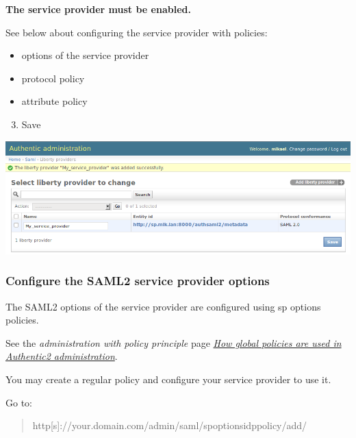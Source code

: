 \documentclass[letterpaper,10pt,english]{sphinxmanual}
\begin{document}
\textbf{The service provider must be enabled.}

See below about configuring the service provider with policies:
\begin{itemize}
\item {} 
options of the service provider

\item {} 
protocol policy

\item {} 
attribute policy

\end{itemize}
\begin{enumerate}
\setcounter{enumi}{2}
\item {} 
Save

\end{enumerate}

\includegraphics{new_saml2_sp_saved.png}


\subsubsection{Configure the SAML2 service provider options}
\label{config_saml2_sp:configure-the-saml2-service-provider-options}
The SAML2 options of the service provider are configured using sp options
policies.

See the \emph{administration with policy principle} page {\hyperref[administration_with_policies:administration-with-policies]{\emph{How global policies are used in Authentic2 administration}}}.

You may create a regular policy and configure your service provider to use it.

Go to:
\begin{quote}

http{[}s{]}://your.domain.com/admin/saml/spoptionsidppolicy/add/
\end{quote}
\end{document}
